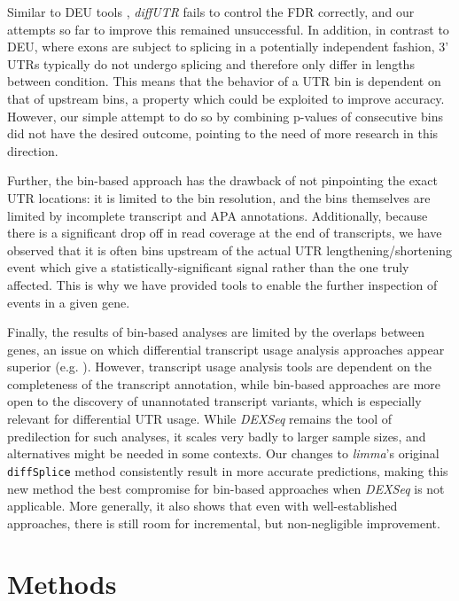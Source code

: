 \documentclass{bmcart}
\begin{document}
Similar to DEU tools \cite{Soneson2016IsoformUsage}, \textit{diffUTR} fails to control the FDR correctly, and our attempts so far to improve this remained unsuccessful. In addition, in contrast to DEU, where exons are subject to splicing in a potentially independent fashion, 3' UTRs typically do not undergo splicing and therefore only differ in lengths between condition. This means that the behavior of a UTR bin is dependent on that of upstream bins, a property which could be exploited to improve accuracy. However, our simple attempt to do so by combining p-values of consecutive bins did not have the desired outcome, pointing to the need of more research in this direction.

Further, the bin-based approach has the drawback of not pinpointing the exact UTR locations: it is limited to the bin resolution, and the bins themselves are limited by incomplete transcript and APA annotations. Additionally, because there is a significant drop off in read coverage at the end of transcripts, we have observed that it is often bins upstream of the actual UTR lengthening/shortening event which give a statistically-significant signal rather than the one truly affected. This is why we have provided tools to enable the further inspection of events in a given gene.

Finally, the results of bin-based analyses are limited by the overlaps between genes, an issue on which differential transcript usage analysis approaches appear superior (e.g. \cite{Tiberi2020BANDITS:Uncertainty}). However, transcript usage analysis tools are dependent on the completeness of the transcript annotation, while bin-based approaches are more open to the discovery of unannotated transcript variants, which is especially relevant for differential UTR usage. While \textit{DEXSeq} remains the tool of predilection for such analyses, it scales very badly to larger sample sizes, and alternatives might be needed in some contexts. Our changes to \textit{limma}'s original \texttt{diffSplice} method consistently result in more accurate predictions, making this new method the best compromise for bin-based approaches when \textit{DEXSeq} is not applicable. More generally, it also shows that even with well-established approaches, there is still room for incremental, but non-negligible improvement.


\section*{Methods}
\end{document}
